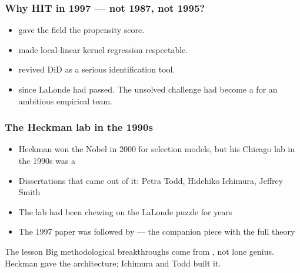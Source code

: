 \documentclass[10pt,aspectratio=169]{beamer}
\begin{document}
\begin{frame}
  \frametitle{Why HIT in 1997 --- not 1987, not 1995?}
  \vspace{0.3cm}
  \begin{itemize}
    \item {} gave the field the propensity score.
    \item {} made local-linear kernel regression respectable.
    \item {} revived DiD as a serious identification tool.
    \item {} since LaLonde had passed. The unsolved challenge
      had become a  for an ambitious empirical team.
  \end{itemize}
\end{frame}

\begin{frame}
  \frametitle{The Heckman lab in the 1990s}
  \vspace{0.3cm}
  \begin{itemize}
    \item Heckman won the Nobel in 2000 for selection models, but his Chicago lab
      in the 1990s was a 
    \item Dissertations that came out of it: Petra Todd, Hidehiko Ichimura, Jeffrey Smith
    \item The lab had been chewing on the LaLonde puzzle for years
    \item The 1997 paper was followed by 
      --- the companion piece with the full theory
  \end{itemize}
  \vspace{0.5em}
  \begin{block}{The lesson}
    Big methodological breakthroughs come from , not lone genius.
    Heckman gave the architecture; Ichimura and Todd built it.
  \end{block}
\end{frame}
\end{document}
